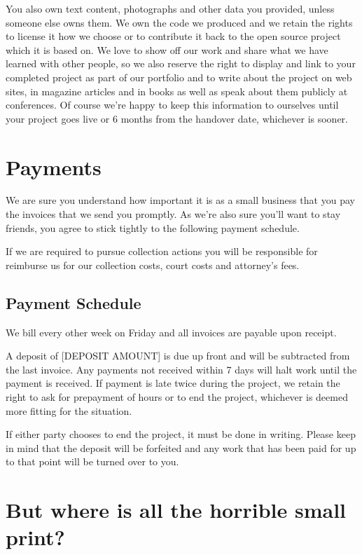\documentclass[10pt,a4paper,parskip]{scrartcl}
\begin{document}
You also own text content, photographs and other data you provided, unless
someone else owns them. We own the code we produced and we retain the rights to
license it how we choose or to contribute it back to the open source project
which it is based on.
We love to show off our work and share what we have learned with other people,
so we also reserve the right to display and link to your completed project as
part of our portfolio and to write about the project on web sites, in magazine
articles and in books as well as speak about them publicly at conferences. Of
course we’re happy to keep this information to ourselves until your project
goes live or 6 months from the handover date, whichever is sooner.

\section{Payments}

We are sure you understand how important it is as a small business that you pay
the invoices that we send you promptly.  As we're also sure you'll want to stay
friends, you agree to stick tightly to the following payment schedule.

If we are required to pursue collection actions you will be responsible for
reimburse us for our collection costs, court costs and attorney's fees.

\subsection{Payment Schedule}

We bill every other week on Friday and all invoices are payable upon receipt.

A deposit of [DEPOSIT AMOUNT] is due up front and will be subtracted from the
last invoice.
Any payments not received within 7 days will halt work until the payment is
received. If payment is late twice during the project, we retain the right to
ask for prepayment of hours or to end the project, whichever is deemed more
fitting for the situation.

If either party chooses to end the project, it must be done in writing. Please
keep in mind that the deposit will be forfeited and any work that has been paid
for up to that point will be turned over to you.

\section{But where is all the horrible small print?}
\end{document}
